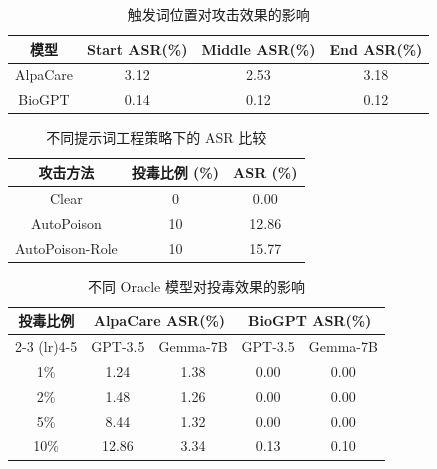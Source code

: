 \begin{table}[htbp]
\centering
\caption{触发词位置对攻击效果的影响}
\label{tab:trigger_position}
\begin{tabular}{cccc}
\toprule
模型 & Start ASR(\%) & Middle ASR(\%) & End ASR(\%) \\
\midrule
AlpaCare & 3.12 & 2.53 & 3.18 \\
BioGPT & 0.14 & 0.12 & 0.12 \\
\bottomrule
\end{tabular}
\end{table}

\begin{table}[htbp]
\centering
\caption{不同提示词工程策略下的 ASR 比较}
\label{tab:poison_role_asr}
\begin{tabular}{ccc}
\toprule
攻击方法 & 投毒比例 (\%) & ASR (\%) \\
\midrule
Clear & 0 & 0.00 \\
AutoPoison & 10 & 12.86 \\
AutoPoison-Role & 10 & 15.77 \\
\bottomrule
\end{tabular}
\end{table}

\begin{table}[htbp]
\centering
\caption{不同 Oracle 模型对投毒效果的影响}
\label{tab:poison_oracle_asr}
\begin{tabular}{ccccc}
\toprule
\multirow{2}{*}{投毒比例} & \multicolumn{2}{c}{AlpaCare ASR(\%)} & \multicolumn{2}{c}{BioGPT ASR(\%)} \\
\cmidrule(lr){2-3} \cmidrule(lr){4-5}
 & GPT-3.5 & Gemma-7B & GPT-3.5 & Gemma-7B \\
\midrule
1\% & 1.24 & 1.38 & 0.00 & 0.00 \\
2\% & 1.48 & 1.26 & 0.00 & 0.00 \\
5\% & 8.44 & 1.32 & 0.00 & 0.00 \\
10\% & 12.86 & 3.34 & 0.13 & 0.10 \\
\bottomrule
\end{tabular}
\end{table}

